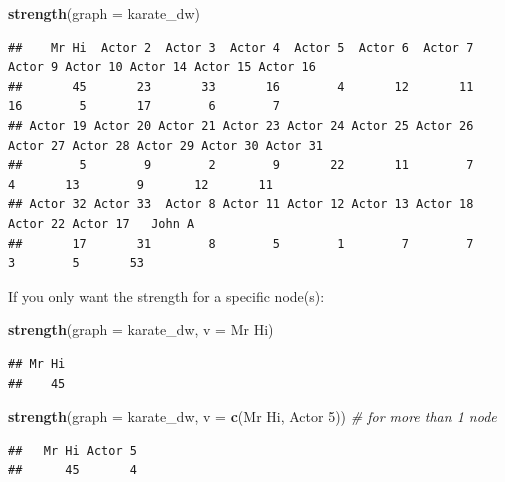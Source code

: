 \documentclass[
]{book}
\newenvironment{Shaded}{\begin{snugshade}}{\end{snugshade}}
\newcommand{\AttributeTok}[1]{\textcolor[rgb]{0.13,0.29,0.53}{#1}}
\newcommand{\CommentTok}[1]{\textcolor[rgb]{0.56,0.35,0.01}{\textit{#1}}}
\newcommand{\FunctionTok}[1]{\textcolor[rgb]{0.13,0.29,0.53}{\textbf{#1}}}
\newcommand{\NormalTok}[1]{#1}
\newcommand{\StringTok}[1]{\textcolor[rgb]{0.31,0.60,0.02}{#1}}
\begin{document}
\begin{Shaded}
\begin{Highlighting}[]
\FunctionTok{strength}\NormalTok{(}\AttributeTok{graph =}\NormalTok{ karate\_dw)}
\end{Highlighting}
\end{Shaded}

\begin{verbatim}
##    Mr Hi  Actor 2  Actor 3  Actor 4  Actor 5  Actor 6  Actor 7  Actor 9 Actor 10 Actor 14 Actor 15 Actor 16 
##       45       23       33       16        4       12       11       16        5       17        6        7 
## Actor 19 Actor 20 Actor 21 Actor 23 Actor 24 Actor 25 Actor 26 Actor 27 Actor 28 Actor 29 Actor 30 Actor 31 
##        5        9        2        9       22       11        7        4       13        9       12       11 
## Actor 32 Actor 33  Actor 8 Actor 11 Actor 12 Actor 13 Actor 18 Actor 22 Actor 17   John A 
##       17       31        8        5        1        7        7        3        5       53
\end{verbatim}

If you only want the strength for a specific node(s):

\begin{Shaded}
\begin{Highlighting}[]
\FunctionTok{strength}\NormalTok{(}\AttributeTok{graph =}\NormalTok{ karate\_dw, }\AttributeTok{v =} \StringTok{\textquotesingle{}Mr Hi\textquotesingle{}}\NormalTok{)}
\end{Highlighting}
\end{Shaded}

\begin{verbatim}
## Mr Hi 
##    45
\end{verbatim}

\begin{Shaded}
\begin{Highlighting}[]
\FunctionTok{strength}\NormalTok{(}\AttributeTok{graph =}\NormalTok{ karate\_dw, }\AttributeTok{v =} \FunctionTok{c}\NormalTok{(}\StringTok{\textquotesingle{}Mr Hi\textquotesingle{}}\NormalTok{, }\StringTok{\textquotesingle{}Actor 5\textquotesingle{}}\NormalTok{)) }\CommentTok{\# for more than 1 node}
\end{Highlighting}
\end{Shaded}

\begin{verbatim}
##   Mr Hi Actor 5 
##      45       4
\end{verbatim}
\end{document}
